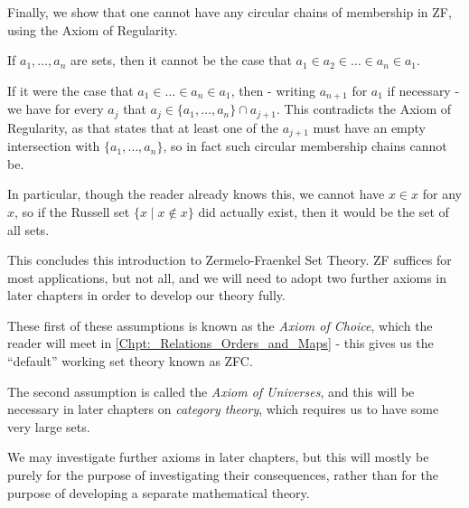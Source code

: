 Finally, we show that one cannot have any circular chains of membership in ZF, using the Axiom of Regularity. 

\begin{thm}
\label{Thm:_No_circular_membership_chains}
If $a_1, \dots, a_n$ are sets, then it cannot be the case that $a_1\in a_2\in \dots \in a_n \in a_1$. 
\end{thm}

\begin{prf}
If it were the case that $a_1\in \dots \in a_n\in a_1$, then - writing $a_{n+1}$ for $a_1$ if necessary - we have for every $a_j$ that $a_j\in\{a_1, \dots, a_n\}\cap a_{j+1}$. This contradicts the Axiom of Regularity, as that states that at least one of the $a_{j+1}$ must have an empty intersection with $\{a_1, \dots, a_n\}$, so in fact such circular membership chains cannot be.  
\end{prf}

In particular, though the reader already knows this, we cannot have $x\in x$ for any $x$, so if the Russell set $\{x\mid x\notin x\}$ did actually exist, then it would be the set of all sets. 

This concludes this introduction to Zermelo-Fraenkel Set Theory. ZF suffices for most applications, but not all, and we will need to adopt two further axioms in later chapters in order to develop our theory fully. 

These first of these assumptions is known as the \emph{Axiom of Choice}, which the reader will meet in \autoref{Chpt:_Relations_Orders_and_Maps} - this gives us the \enquote{default} working set theory known as ZFC. 

The second assumption is called the \emph{Axiom of Universes}, and this will be necessary in later chapters on \emph{category theory}, which requires us to have some very large sets. 

We may investigate further axioms in later chapters, but this will mostly be purely for the purpose of investigating their consequences, rather than for the purpose of developing a separate mathematical theory.